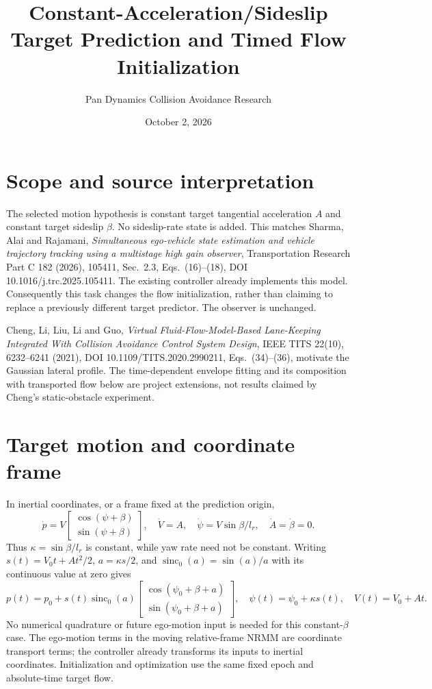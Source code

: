 \documentclass[11pt]{article}
\title{Constant-Acceleration/Sideslip Target Prediction and Timed Flow Initialization}
\author{Pan Dynamics Collision Avoidance Research}
\date{October 2, 2026}
\begin{document}
\maketitle
\section{Scope and source interpretation}
The selected motion hypothesis is constant target tangential acceleration $A$
and constant target sideslip $\beta$. No sideslip-rate state is added. This
matches Sharma, Alai and Rajamani, \emph{Simultaneous ego-vehicle state
estimation and vehicle trajectory tracking using a multistage high gain
observer}, Transportation Research Part C 182 (2026), 105411, Sec.\ 2.3,
Eqs.\ (16)--(18), DOI 10.1016/j.trc.2025.105411. The existing controller already implements this model.
Consequently this task changes the flow initialization, rather than claiming
to replace a previously different target predictor. The observer is unchanged.

Cheng, Li, Liu, Li and Guo, \emph{Virtual Fluid-Flow-Model-Based Lane-Keeping
Integrated With Collision Avoidance Control System Design}, IEEE TITS 22(10),
6232--6241 (2021), DOI 10.1109/TITS.2020.2990211, Eqs.\ (34)--(36), motivate
the Gaussian lateral profile. The time-dependent envelope fitting and its
composition with transported flow below are project extensions, not results
claimed by Cheng's static-obstacle experiment.

\section{Target motion and coordinate frame}
In inertial coordinates, or a frame fixed at the prediction origin,
\[
 \dot p=V\begin{bmatrix}\cos(\psi+\beta)\\\sin(\psi+\beta)\end{bmatrix},\quad
 \dot V=A,\quad \dot\psi=V\sin\beta/l_r,\quad \dot A=\dot\beta=0.
\]
Thus $\kappa=\sin\beta/l_r$ is constant, while yaw rate need not be constant.
Writing $s(t)=V_0t+At^2/2$, $a=\kappa s/2$, and
$\operatorname{sinc}_0(a)=\sin(a)/a$ with its continuous value at zero gives
\[
 p(t)=p_0+s(t)\operatorname{sinc}_0(a)
 \begin{bmatrix}\cos(\psi_0+\beta+a)\\\sin(\psi_0+\beta+a)\end{bmatrix},\quad
 \psi(t)=\psi_0+\kappa s(t),\quad V(t)=V_0+At.
\]
No numerical quadrature or future ego-motion input is needed for this
constant-$\beta$ case. The ego-motion terms in the moving relative-frame NRMM
are coordinate transport terms; the controller already transforms its inputs
to inertial coordinates. Initialization and optimization use the same fixed
epoch and absolute-time target flow.
\end{document}
